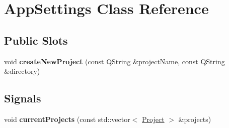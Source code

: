 \hypertarget{class_app_settings}{}\section{App\+Settings Class Reference}
\label{class_app_settings}
\subsection*{Public Slots}
\begin{DoxyCompactItemize}
\item 
void {\bfseries create\+New\+Project} (const Q\+String \&project\+Name, const Q\+String \&directory)\hypertarget{class_app_settings_a4758ae8be089a60cd0e52d250d2c9cc6}{}\label{class_app_settings_a4758ae8be089a60cd0e52d250d2c9cc6}

\end{DoxyCompactItemize}
\subsection*{Signals}
\begin{DoxyCompactItemize}
\item 
void {\bfseries current\+Projects} (const std\+::vector$<$ \hyperlink{struct_project}{Project} $>$ \&projects)\hypertarget{class_app_settings_a04473f72a9337a7561c69a617d3e8644}{}\label{class_app_settings_a04473f72a9337a7561c69a617d3e8644}

\end{DoxyCompactItemize}
